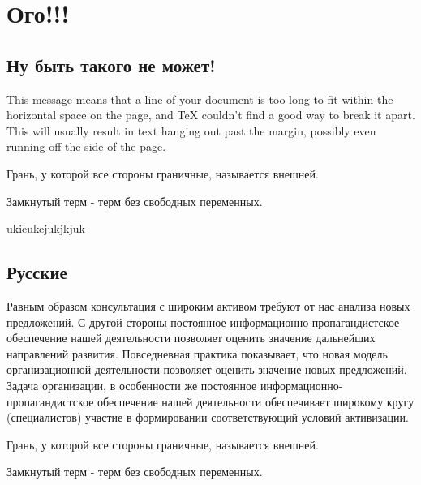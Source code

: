 \documentclass[17pt, a4paper]{extarticle}
\begin{document}
\section{Ого!!!}

\subsection{Ну быть такого не может!}

This message means that a line of your document is too long to fit within the
horizontal space on the page, and TeX couldn't find a good way to break
it apart. This will usually result in text hanging out past the margin, possibly
even running off the side of the page.

\begin{define}
Грань, у которой все стороны граничные, называется внешней.
\end{define}

\begin{define}
Замкнутый терм - терм без свободных переменных.
\end{define}

\begin{example}
ukieukejukjkjuk
\end{example}

\newpage

\subsection{Русские}

Равным образом консультация с широким активом требуют от нас анализа новых предложений. С другой стороны постоянное информационно-пропагандистское
обеспечение нашей деятельности позволяет оценить значение дальнейших направлений развития. Повседневная практика показывает, что новая модель
организационной деятельности позволяет оценить значение новых предложений. Задача организации, в особенности же постоянное информационно-пропагандистское
обеспечение нашей деятельности обеспечивает широкому кругу (специалистов) участие в формировании соответствующий условий активизации.

\begin{define}
Грань, у которой все стороны граничные, называется внешней.
\end{define}

\begin{define}
Замкнутый терм - терм без свободных переменных.
\end{define}
\end{document}
